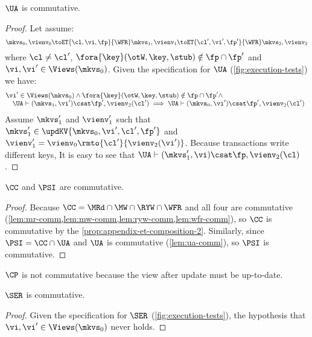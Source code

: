 \begin{lemma}
    \label{lem:ua-comm}
    \(\UA\) is commutative.
\end{lemma}
\begin{proof}
    Let assume:
    \[
        \mkvs_0, \vienv_0 \toET{\cl, \vi, \fp}{\WFR} \mkvs_1, \vienv_1 \toET{\cl', \vi', \fp'}{\WFR} \mkvs_2, \vienv_2 
    \]
    where \( \cl \neq \cl' \), \( \fora{ \key } (\otW, \key, \stub) \notin \fp \cap \fp' \) and \( \vi, \vi' \in \Views(\mkvs_0)\).
    Given the specification for \( \UA \) (\cref{fig:execution-tests}) we have:
    \[
        \begin{array}{@{}l}
            \vi' \in \Views(\mkvs_0) \land \fora{ \key } (\otW, \key, \stub) \notin \fp \cap \fp' \land \\ 
            \quad \UA \vdash (\mkvs_1, \vi') \csat \fp', \vienv_2(\cl') \implies  \UA \vdash (\mkvs_0, \vi') \csat \fp', \vienv_2(\cl')
        \end{array}
    \]
    Assume \( \mkvs'_1 \) and \( \vienv'_1 \) such that \( \mkvs'_1 \in \updKV{\mkvs_0,\vi',\cl',\fp'} \) and \( \vienv'_1 = \vienv_0\rmto{\cl'}{\vienv_2(\vi')} \).
    Because transactions write different keys, It is easy to see that \( \UA \vdash (\mkvs'_1, \vi) \csat \fp, \vienv_2(\cl) \).
\end{proof}

\begin{proposition}
    \( \CC \) and \( \PSI \) are commutative.
\end{proposition}
\begin{proof}
    Because \( \CC = \MRd \cap \MW \cap \RYW \cap \WFR \) and all four are commutative (\cref{lem:mr-comm,lem:mw-comm,lem:ryw-comm,lem:wfr-comm}), so \( \CC \) is commutative by the \cref{prop:appendix-et-composition-2}.
    Similarly, since \( \PSI = \CC \cap \UA \) and \( \UA \) is commutative (\cref{lem:ua-comm}), so \( \PSI \) is commutative.
\end{proof}

\( \CP \) is not commutative because the view after update must be up-to-date.

\begin{lemma}
    \label{lem:ser-comm}
    \( \SER \) is commutative.
\end{lemma}
\begin{proof}
    Given the specification for \( \SER \) (\cref{fig:execution-tests}), the hypothesis that \( \vi, \vi' \in \Views(\mkvs_0) \) never holds.
\end{proof}

